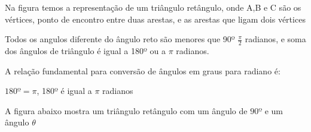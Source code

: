 \begin{multicols*}{2}
\begin{figure}[H]
\begin{tikzpicture}[x=0.75pt,y=0.75pt,yscale=-1,xscale=1]
    \end{tikzpicture}

    \end{figure}

    Na figura temos a representação de um triângulo retângulo, onde A,B e C são os vértices, ponto de 		encontro entre duas arestas, e as arestas que ligam dois vértices

    Todos os angulos diferente do ângulo reto são menores que 90º $\frac{\pi}{2}$ radianos, e soma dos 		ângulos de triângulo é 		igual a 180º ou a $\pi$ radianos.

    A relação fundamental para conversão de ângulos em graus para radiano é:

    $180º = \pi$, 180º é igual a $\pi$ radianos

    A figura abaixo mostra um triângulo retângulo com um ângulo de $90º$ e um ângulo $\theta$




    \begin{figure}[H]
        \centering
\end{figure}
\end{multicols*}

